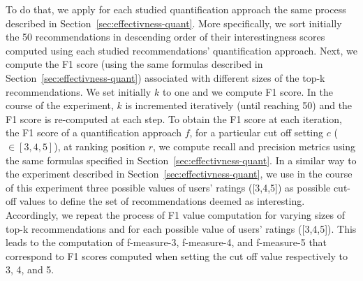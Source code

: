 To do that, we apply for each studied quantification approach the same process described in Section~\ref{sec:effectivness-quant}.
More specifically, we sort initially the 50 recommendations in descending order of their interestingness scores computed using each studied recommendations' quantification approach. Next, we compute  the F1 score (using the same formulas described in Section~\ref{sec:effectivness-quant}) associated with different sizes of the top-k recommendations.
We set initially $k$ to one and we compute F1 score. In the course of the experiment, $k$ is incremented iteratively (until reaching 50) and the F1 score is re-computed at each step.
To obtain the F1 score at each iteration, the F1 score of a quantification approach $f$, for a particular cut off setting $c$ ($\in [3,4,5]$), at ranking position $r$, we compute recall and precision metrics using the same formulas specified in Section~\ref{sec:effectivness-quant}.
% 
%
In a similar way to the experiment described in Section~\ref{sec:effectivness-quant}, we use in the course of this experiment three possible values of users' ratings ([3,4,5]) as possible cut-off values to define the set of recommendations deemed as interesting.
Accordingly, we repeat the process of F1 value computation for varying sizes of top-k recommendations and for each possible value of users' ratings ([3,4,5]). This leads to the computation of f-measure-3, f-measure-4, and f-measure-5 that correspond to F1 scores computed when setting the cut off value respectively to 3, 4, and 5.



